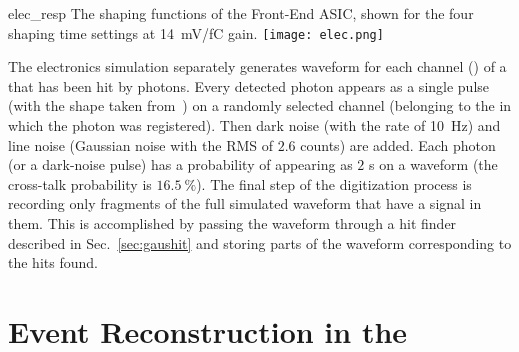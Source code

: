 \begin{dunefigure}
{elec_resp}
{The shaping functions of the Front-End ASIC, shown for the four shaping
time settings at \SI{14}{mV/fC} gain.}
\texttt{[image: elec.png]}
\end{dunefigure}



The  electronics simulation separately generates waveform 
for each channel () of a  that has been hit by photons.
Every detected photon %
appears as a single \phel{} pulse
(with the shape taken from~\cite{http://lss.fnal.gov/archive/2015/pub/fermilab-pub-15-488-nd-ppd.pdf:2015gov}) on a randomly selected channel
(belonging to the  in which the photon was registered).
Then dark noise (with the rate of \SI{10}{Hz}) and 
line noise (Gaussian noise with the RMS of $2.6$  counts) are added.
Each photon (or a dark-noise pulse) has a probability of appearing
as $2$ \phel{}s on a waveform (the cross-talk probability is $16.5~\%$).
The final step of the digitization process is recording only fragments
of the full simulated waveform that have a signal in them.
This is accomplished by passing the waveform through a hit finder
described in Sec.~\ref{sec:gaushit} 
and storing parts of the waveform corresponding to the hits found.


\section{Event Reconstruction in the }
\label{sec:tools-fdreco}

